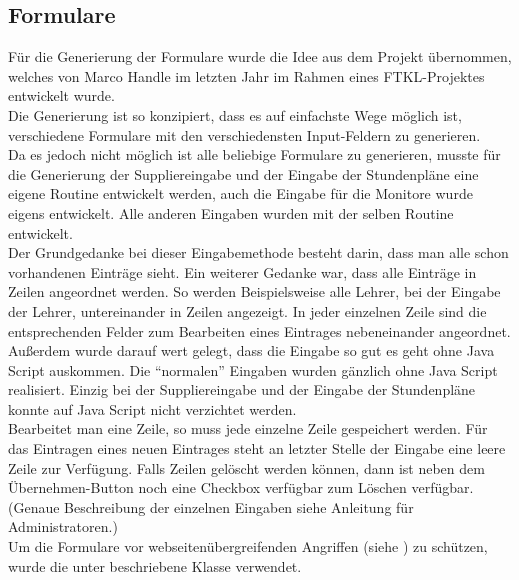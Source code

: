 \subsection{Formulare} \label{sec:content_draft_form}
Für die Generierung der Formulare wurde die Idee aus dem Projekt übernommen, welches von Marco Handle im letzten Jahr im Rahmen eines FTKL-Projektes entwickelt wurde.\\
Die Generierung ist so konzipiert, dass es auf einfachste Wege möglich ist, verschiedene Formulare mit den verschiedensten Input-Feldern zu generieren.\\
Da es jedoch nicht möglich ist alle beliebige Formulare zu generieren, musste für die Generierung der Suppliereingabe und der Eingabe der Stundenpläne eine eigene Routine entwickelt werden, auch die Eingabe für die Monitore wurde eigens entwickelt. Alle anderen Eingaben wurden mit der selben Routine entwickelt.\\
Der Grundgedanke bei dieser Eingabemethode besteht darin, dass man alle schon vorhandenen Einträge sieht. Ein weiterer Gedanke war, dass alle Einträge in Zeilen angeordnet werden. So werden Beispielsweise alle Lehrer, bei der Eingabe der Lehrer, untereinander in Zeilen angezeigt. In jeder einzelnen Zeile sind die entsprechenden Felder zum Bearbeiten eines Eintrages nebeneinander angeordnet. Außerdem wurde darauf wert gelegt, dass die Eingabe so gut es geht ohne Java Script auskommen. Die \enquote{normalen} Eingaben wurden gänzlich ohne Java Script realisiert. Einzig bei der Suppliereingabe und der Eingabe der Stundenpläne konnte auf Java Script nicht verzichtet werden.\\
Bearbeitet man eine Zeile, so muss jede einzelne Zeile gespeichert werden. Für das Eintragen eines neuen Eintrages steht an letzter Stelle der Eingabe eine leere Zeile zur Verfügung. Falls Zeilen gelöscht werden können, dann ist neben dem Übernehmen-Button noch eine Checkbox verfügbar zum Löschen verfügbar. (Genaue Beschreibung der einzelnen Eingaben siehe Anleitung für Administratoren.)\\
Um die Formulare vor webseitenübergreifenden Angriffen (siehe ) zu schützen, wurde die unter  beschriebene Klasse verwendet.
